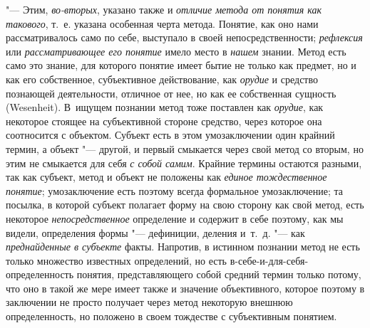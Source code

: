"--- Этим, {\em во-вторых},
указано также и
{\em отличие метода от понятия как
такового}, т.~е. указана особенная черта метода. Понятие,
как оно нами рассматривалось само по себе, выступало в своей
непосредственности; {\em рефлексия}
или {\em рассматривающее
его понятие }имело место в
{\em нашем} знании. Метод
есть само это знание, для которого понятие имеет бытие не только как
предмет, но и как его собственное, субъективное действование, как
{\em орудие} и средство
познающей деятельности, отличное от нее, но как ее собственная сущность
(Wesenheit). В~ищущем познании метод тоже поставлен как
{\em орудие}, как
некоторое стоящее на субъективной стороне средство, через которое она
соотносится с объектом. Субъект есть в этом умозаключении один крайний
термин, а объект "--- другой, и первый смыкается через свой
метод со вторым, но этим не смыкается для себя
{\em с собой самим}.
Крайние термины остаются разными, так как субъект, метод и
объект не положены как {\em единое
тождественное понятие}; умозаключение есть поэтому всегда
формальное умозаключение; та посылка, в которой субъект полагает форму на
свою сторону как свой метод, есть некоторое
{\em непосредственное}
определение и содержит в себе поэтому, как мы видели,
определения формы "--- дефиниции, деления и~т.~д. "---
как {\em преднайденные в
субъекте} факты. Напротив, в истинном познании метод не есть
только множество известных определений, но есть
в-себе-и-для-себя-определенность понятия, представляющего собой средний
термин только потому, что оно в такой же мере имеет также и значение
объективного, которое поэтому в заключении не просто получает через метод
некоторую внешнюю определенность, но положено в своем тождестве с
субъективным понятием.


